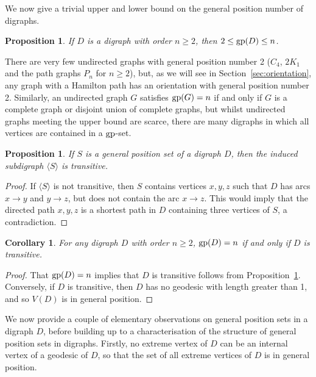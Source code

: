 \documentclass[a4paper,12pt]{article}
\newtheorem{corollary}[theorem]{Corollary}
\newtheorem{proposition}[theorem]{Proposition}
\theoremstyle{definition}
\newcommand{\gp}{{\rm gp}}
\begin{document}
	We now give a trivial upper and lower bound on the general position number of digraphs. 
	
	\begin{proposition}\label{prop1}
		If $D$ is a digraph with order $n \geq 2$, then $2 \leq \gp (D) \leq n$. 
	\end{proposition}
	
	There are very few undirected graphs with general position number 2 ($C_4$, $2K_1$ and the path graphs $P_n$ for $n \geq 2$), but, as we will see in Section~\ref{sec:orientation}, any graph with a Hamilton path has an orientation with general position number 2. Similarly, an undirected graph $G$ satisfies $\gp (G) = n$ if and only if $G$ is a complete graph or disjoint union of complete graphs, but whilst undirected graphs meeting the upper bound are scarce, there are many digraphs in which all vertices are contained in a $\gp $-set.
	
	\begin{proposition}\label{prop:gpsetsaretransitive}
		If $S$ is a general position set of a digraph $D$, then the induced subdigraph $\langle S\rangle$ is transitive.
	\end{proposition}
	\begin{proof}
		If $\langle S\rangle$ is not transitive, then $S$ contains vertices $x,y,z$ such that $D$ has arcs $x \rightarrow y$ and $y \rightarrow z$, but does not contain the arc $x \rightarrow z$. This would imply that the directed path $x,y,z$ is a shortest path in $D$ containing three vertices of $S$, a contradiction.
	\end{proof}
	
	\begin{corollary}\label{cor2.5}
		For any digraph $D$ with order $n \geq 2$, $\gp (D) = n$ if and only if $D$ is transitive.
	\end{corollary}
	\begin{proof}
		That $\gp (D) = n$ implies that $D$ is transitive follows from Proposition~\ref{prop:gpsetsaretransitive}. Conversely, if $D$ is transitive, then $D$ has no geodesic with length greater than 1, and so $V(D)$ is in general position. 
	\end{proof}
	
	We now provide a couple of elementary observations on general position sets in a digraph $D$, before building up to a characterisation of the structure of general position sets in digraphs. Firstly, no extreme vertex of $D$ can be an internal vertex of a geodesic of $D$, so that the set of all extreme vertices of $D$ is in general position.
	
\end{document}
